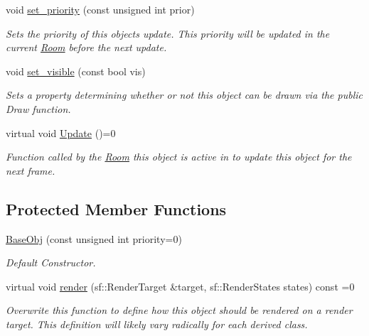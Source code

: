 \begin{DoxyCompactItemize}
void \hyperlink{class_helios_1_1_base_obj_ad3335cdcb1dfc4ee7e749dbb32f8cd2a}{set\+\_\+priority} (const unsigned int prior)
\begin{DoxyCompactList}\small\item\em Sets the priority of this object\textquotesingle{}s update. This priority will be updated in the current \hyperlink{class_helios_1_1_room}{Room} before the next update. \end{DoxyCompactList}\item 
void \hyperlink{class_helios_1_1_base_obj_a354767a20905778fefe96fe895a382ae}{set\+\_\+visible} (const bool vis)
\begin{DoxyCompactList}\small\item\em Sets a property determining whether or not this object can be drawn via the public Draw function. \end{DoxyCompactList}\item 
\hypertarget{class_helios_1_1_base_obj_aa42e26e872234b6871d159c29afdef17}{}virtual void \hyperlink{class_helios_1_1_base_obj_aa42e26e872234b6871d159c29afdef17}{Update} ()=0\label{class_helios_1_1_base_obj_aa42e26e872234b6871d159c29afdef17}

\begin{DoxyCompactList}\small\item\em Function called by the \hyperlink{class_helios_1_1_room}{Room} this object is active in to update this object for the next frame. \end{DoxyCompactList}\end{DoxyCompactItemize}
\subsection*{Protected Member Functions}
\begin{DoxyCompactItemize}
\item 
\hyperlink{class_helios_1_1_base_obj_ad77bdec51d537c1bfc9661b728980498}{Base\+Obj} (const unsigned int priority=0)
\begin{DoxyCompactList}\small\item\em Default Constructor. \end{DoxyCompactList}\item 
\hypertarget{class_helios_1_1_base_obj_af7355477f06d38692dc6cdb6f99dbd11}{}virtual void \hyperlink{class_helios_1_1_base_obj_af7355477f06d38692dc6cdb6f99dbd11}{render} (sf\+::\+Render\+Target \&target, sf\+::\+Render\+States states) const  =0\label{class_helios_1_1_base_obj_af7355477f06d38692dc6cdb6f99dbd11}

\begin{DoxyCompactList}\small\item\em Overwrite this function to define how this object should be rendered on a render target. This definition will likely vary radically for each derived class. \end{DoxyCompactList}\end{DoxyCompactItemize}
